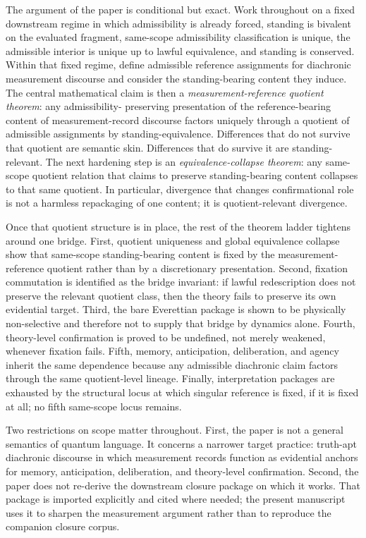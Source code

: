 The argument of the paper is conditional but exact. Work throughout on a fixed downstream regime in
which admissibility is already forced, standing is bivalent on the evaluated fragment, same-scope
admissibility classification is unique, the admissible interior is unique up to lawful equivalence, and
standing is conserved. Within that fixed regime, define admissible reference assignments for
diachronic measurement discourse and consider the standing-bearing content they induce. The central
mathematical claim is then a \emph{measurement-reference quotient theorem}: any admissibility-
preserving presentation of the reference-bearing content of measurement-record discourse factors
uniquely through a quotient of admissible assignments by standing-equivalence. Differences that do
not survive that quotient are semantic skin. Differences that do survive it are standing-relevant. The
next hardening step is an \emph{equivalence-collapse theorem}: any same-scope quotient relation that
claims to preserve standing-bearing content collapses to that same quotient. In particular, divergence
that changes confirmational role is not a harmless repackaging of one content; it is quotient-relevant
divergence.

Once that quotient structure is in place, the rest of the theorem ladder tightens around one bridge.
First, quotient uniqueness and global equivalence collapse show that same-scope standing-bearing
content is fixed by the measurement-reference quotient rather than by a discretionary presentation.
Second, fixation commutation is identified as the bridge invariant: if lawful redescription does not
preserve the relevant quotient class, then the theory fails to preserve its own evidential target. Third,
the bare Everettian package is shown to be physically non-selective and therefore not to supply that
bridge by dynamics alone. Fourth, theory-level confirmation is proved to be undefined, not merely
weakened, whenever fixation fails. Fifth, memory, anticipation, deliberation, and agency inherit the
same dependence because any admissible diachronic claim factors through the same quotient-level
lineage. Finally, interpretation packages are exhausted by the structural locus at which singular
reference is fixed, if it is fixed at all; no fifth same-scope locus remains.

Two restrictions on scope matter throughout. First, the paper is not a general semantics of quantum
language. It concerns a narrower target practice: truth-apt diachronic discourse in which
measurement records function as evidential anchors for memory, anticipation, deliberation, and
theory-level confirmation. Second, the paper does not re-derive the downstream closure package on
which it works. That package is imported explicitly and cited where needed; the present manuscript
uses it to sharpen the measurement argument rather than to reproduce the companion closure corpus.

